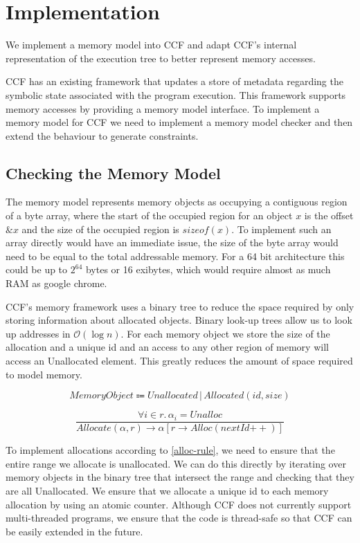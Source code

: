 \documentclass[12pt,twoside]{report}
\begin{document}
\chapter{Implementation}
We implement a memory model into CCF and adapt CCF's internal representation of the execution tree to better represent memory accesses.

CCF has an existing framework that updates a store of metadata regarding the symbolic state associated with the program execution. This framework supports memory accesses by providing a memory model interface. To implement a memory model for CCF we need to implement a memory model checker and then extend the behaviour to generate constraints.

\section{Checking the Memory Model}
The memory model represents memory objects as occupying a contiguous region of a byte array, where the start of the occupied region for an object $x$ is the offset $\&x$ and the size of the occupied region is $sizeof(x)$. To implement such an array directly would have an immediate issue, the size of the byte array would need to be equal to the total addressable memory. For a 64 bit architecture this could be up to $2^64$ bytes or 16 exibytes, which would require almost as much RAM as google chrome.

CCF's memory framework uses a binary tree to reduce the space required by only storing information about allocated objects. Binary look-up trees allow us to look up addresses in $\mathcal{O}(\log{}n)$. For each memory object we store the size of the allocation and a unique id and an access to any other region of memory will access an Unallocated element. This greatly reduces the amount of space required to model memory.

$$MemoryObject \Coloneqq Unallocated \, | \, Allocated(id, size)$$

\begin{equation}\label{alloc-rule}
\frac{\forall i \in r. \, \alpha_i = Unalloc}{Allocate(\alpha, r) \rightarrow \alpha[r \rightarrow Alloc(nextId\mathrel{{+}{+}})]}
\end{equation}

To implement allocations according to \eqref{alloc-rule}, we need to ensure that the entire range we allocate is unallocated. We can do this directly by iterating over memory objects in the binary tree that intersect the range and checking that they are all Unallocated. We ensure that we allocate a unique id to each memory allocation by using an atomic counter. Although CCF does not currently support multi-threaded programs, we ensure that the code is thread-safe so that CCF can be easily extended in the future.
\end{document}
